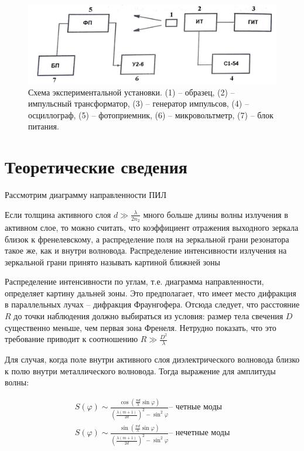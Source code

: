 \documentclass[a4paper,12pt]{article}
\begin{document}
\begin{figure}[h!]
	\centering
	\includegraphics[width=\linewidth]{setup}
	\caption{Схема экспериментальной установки. (1) -- образец, (2) -- импульсный трансформатор, (3) -- генератор импульсов, (4) -- осциллограф, (5) -- фотоприемник, (6) -- микровольтметр, (7) -- блок питания.}
\end{figure}

\section{Теоретические сведения}

Рассмотрим диаграмму направленности ПИЛ

Если толщина активного слоя $d \gg \frac{\lambda}{2n_2}$ много больше длины волны излучения в активном слое, то можно считать, что коэффициент отражения выходного зеркала близок к френелевскому, а распределение поля на зеркальной грани резонатора такое же, как и внутри волновода. Распределение интенсивности излучения на зеркальной грани принято называть картиной ближней зоны

Распределение интенсивности по углам, т.е. диаграмма направленности, определяет картину дальней зоны. Это предполагает, что имеет место дифракция в параллельных лучах -- дифракция Фраунгофера. Отсюда следует, что расстояние $R$ до точки наблюдения должно выбираться из условия: размер тела свечения $D$ существенно меньше, чем первая зона Френеля. Нетрудно показать, что это требование приводит к соотношению $R \gg \frac{D^2}{\lambda}$

Для случая, когда поле внутри активного слоя диэлектрического волновода близко к полю внутри металлического волновода. Тогда выражение для амплитуды волны:

\begin{align*}
	S(\varphi) \sim \frac{\cos \left( \frac{\pi d}{\lambda} \sin \varphi \right) }{\left( \frac{\lambda(m+1)}{2d}\right)^2 - \sin^2 \varphi} \text{-- четные моды} \\
	S(\varphi) \sim \frac{\sin \left( \frac{\pi d}{\lambda} \sin \varphi \right) }{\left( \frac{\lambda(m+1)}{2d}\right)^2 - \sin^2 \varphi} \text{-- нечетные моды}
\end{align*}
\end{document}

